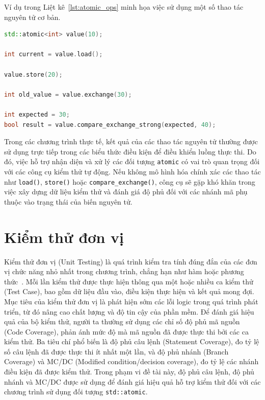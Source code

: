 Ví dụ trong Liệt kê~\ref{lst:atomic_ops} minh họa việc sử dụng một số thao tác nguyên tử cơ bản.

\begin{lstlisting}[language=C++,caption={Các thao tác nguyên tử phổ biến},label={lst:atomic_ops}]
std::atomic<int> value(10);

int current = value.load();

value.store(20);

int old_value = value.exchange(30);

int expected = 30;
bool result = value.compare_exchange_strong(expected, 40);
\end{lstlisting}

Trong các chương trình thực tế, kết quả của các thao tác nguyên tử thường được sử dụng trực tiếp trong các biểu thức điều kiện để điều khiển luồng thực thi. Do đó, việc hỗ trợ nhận diện và xử lý các đối tượng \texttt{atomic} có vai trò quan trọng đối với các công cụ kiểm thử tự động. Nếu không mô hình hóa chính xác các thao tác như \texttt{load()}, \texttt{store()} hoặc \texttt{compare\_exchange()}, công cụ sẽ gặp khó khăn trong việc xây dựng dữ liệu kiểm thử và đánh giá độ phủ đối với các nhánh mã phụ thuộc vào trạng thái của biến nguyên tử.

\section{Kiểm thử đơn vị}

Kiểm thử đơn vị (Unit Testing) là quá trình kiểm tra tính đúng đắn của các đơn vị chức năng nhỏ nhất trong chương trình, chẳng hạn như hàm hoặc phương thức~\cite{phamngochung2014testing}. Mỗi lần kiểm thử được thực hiện thông qua một hoặc nhiều ca kiểm thử (Test Case), bao gồm dữ liệu đầu vào, điều kiện thực hiện và kết quả mong đợi. Mục tiêu của kiểm thử đơn vị là phát hiện sớm các lỗi logic trong quá trình phát triển, từ đó nâng cao chất lượng và độ tin cậy của phần mềm. Để đánh giá hiệu quả của bộ kiểm thử, người ta thường sử dụng các chỉ số độ phủ mã nguồn (Code Coverage), phản ánh mức độ mà mã nguồn đã được thực thi bởi các ca kiểm thử. Ba tiêu chí phổ biến là độ phủ câu lệnh (Statement Coverage), đo tỷ lệ số câu lệnh đã được thực thi ít nhất một lần, và độ phủ nhánh (Branch Coverage) và MC/DC (Modified condition/decision coverage), đo tỷ lệ các nhánh điều kiện đã được kiểm thử. Trong phạm vi đề tài này, độ phủ câu lệnh, độ phủ nhánh và MC/DC được sử dụng để đánh giá hiệu quả hỗ trợ kiểm thử đối với các chương trình sử dụng đối tượng \texttt{std::atomic}.


